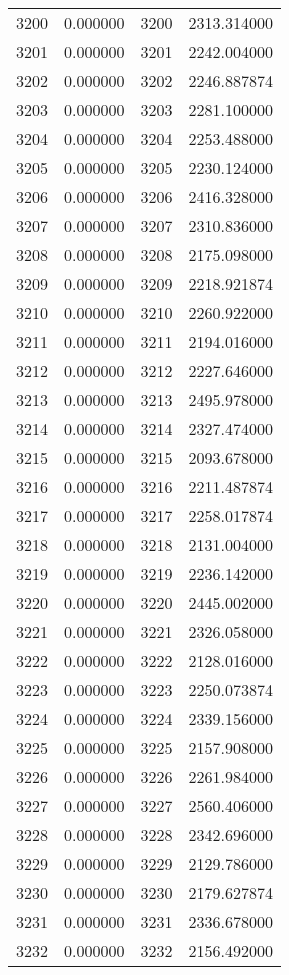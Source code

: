 \documentclass[12pt]{article}
\begin{document}
\begin{longtable}{@{}cccc@{}}
3200 & 0.000000 & 3200 & 2313.314000 \\
3201 & 0.000000 & 3201 & 2242.004000 \\
3202 & 0.000000 & 3202 & 2246.887874 \\
3203 & 0.000000 & 3203 & 2281.100000 \\
3204 & 0.000000 & 3204 & 2253.488000 \\
3205 & 0.000000 & 3205 & 2230.124000 \\
3206 & 0.000000 & 3206 & 2416.328000 \\
3207 & 0.000000 & 3207 & 2310.836000 \\
3208 & 0.000000 & 3208 & 2175.098000 \\
3209 & 0.000000 & 3209 & 2218.921874 \\
3210 & 0.000000 & 3210 & 2260.922000 \\
3211 & 0.000000 & 3211 & 2194.016000 \\
3212 & 0.000000 & 3212 & 2227.646000 \\
3213 & 0.000000 & 3213 & 2495.978000 \\
3214 & 0.000000 & 3214 & 2327.474000 \\
3215 & 0.000000 & 3215 & 2093.678000 \\
3216 & 0.000000 & 3216 & 2211.487874 \\
3217 & 0.000000 & 3217 & 2258.017874 \\
3218 & 0.000000 & 3218 & 2131.004000 \\
3219 & 0.000000 & 3219 & 2236.142000 \\
3220 & 0.000000 & 3220 & 2445.002000 \\
3221 & 0.000000 & 3221 & 2326.058000 \\
3222 & 0.000000 & 3222 & 2128.016000 \\
3223 & 0.000000 & 3223 & 2250.073874 \\
3224 & 0.000000 & 3224 & 2339.156000 \\
3225 & 0.000000 & 3225 & 2157.908000 \\
3226 & 0.000000 & 3226 & 2261.984000 \\
3227 & 0.000000 & 3227 & 2560.406000 \\
3228 & 0.000000 & 3228 & 2342.696000 \\
3229 & 0.000000 & 3229 & 2129.786000 \\
3230 & 0.000000 & 3230 & 2179.627874 \\
3231 & 0.000000 & 3231 & 2336.678000 \\
3232 & 0.000000 & 3232 & 2156.492000 \\

\end{longtable}
\end{document}
